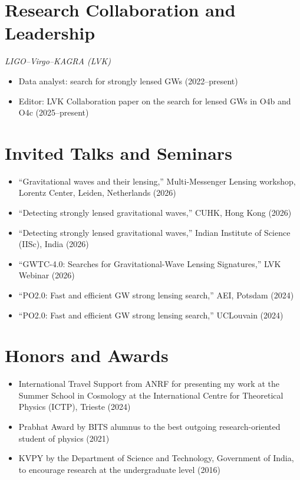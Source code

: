 \documentclass[a4paper,11pt]{article}
\begin{document}
\section{Research Collaboration and Leadership}
\textit{LIGO--Virgo--KAGRA (LVK)}
\begin{itemize}[nosep,after=\strut,leftmargin=1em,itemsep=3pt]
\item[--] Data analyst: search for strongly lensed GWs (2022--present)
\item[--] Editor: LVK Collaboration paper on the search for lensed GWs in O4b and O4c (2025--present)
\end{itemize}

\section{Invited Talks and Seminars}
\begin{itemize}[nosep,after=\strut,leftmargin=1em,itemsep=3pt]
\item[--] ``Gravitational waves and their lensing,'' Multi-Messenger Lensing workshop, Lorentz Center, Leiden, Netherlands (2026)
\item[--] ``Detecting strongly lensed gravitational waves,'' CUHK, Hong Kong (2026)
\item[--] ``Detecting strongly lensed gravitational waves,'' Indian Institute of Science (IISc), India (2026)
\item[--] ``GWTC-4.0: Searches for Gravitational-Wave Lensing Signatures,'' LVK Webinar (2026)
\item[--] ``PO2.0: Fast and efficient GW strong lensing search,'' AEI, Potsdam (2024)
\item[--] ``PO2.0: Fast and efficient GW strong lensing search,'' UCLouvain (2024)
\end{itemize}

\section{Honors and Awards}
\begin{itemize}[nosep,after=\strut,leftmargin=1em,itemsep=3pt]
\item[--] International Travel Support from ANRF for presenting my work at the Summer School in Cosmology at the International Centre for Theoretical Physics (ICTP), Trieste (2024)
\item[--] Prabhat Award by BITS alumnus to the best outgoing research-oriented student of physics (2021)
\item[--] KVPY by the Department of Science and Technology, Government of India, to encourage research at the undergraduate level (2016)
\end{itemize}
\end{document}
